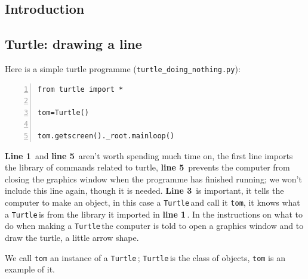 \documentclass[11pt,a4paper]{scrartcl}
\newcommand{\turtle}{\texttt{Turtle}\,}
\newcommand{\lnn}[1]{\textbf{line #1}\,}
\newcommand{\Lnn}[1]{\textbf{Line #1}\,}
\begin{document}
\subsection*{Introduction}

\subsection*{Turtle: drawing a line}

Here is a simple turtle programme (\texttt{turtle\_doing\_nothing.py}):
\begin{lstlisting}[numbers=left]
from turtle import *

tom=Turtle()

tom.getscreen()._root.mainloop()
\end{lstlisting}
\Lnn{1} and \lnn{5} aren't worth spending much time on, the first line
imports the library of commands related to turtle, \lnn{5} prevents
the computer from closing the graphics window when the programme has
finished running; we won't include this line again, though it is
needed. \Lnn{3} is important, it tells the computer to make an object,
in this case a \turtle and call it \texttt{tom}, it knows what a
\turtle is from the library it imported in \lnn{1}. In the instructions
on what to do when making a \turtle the computer is told to open a
graphics window and to draw the turtle, a little arrow shape.
\begin{center}
\end{center}
We call \texttt{tom} an instance of a \turtle; \turtle is the class of
objects, \texttt{tom} is an example of it.
\end{document}
